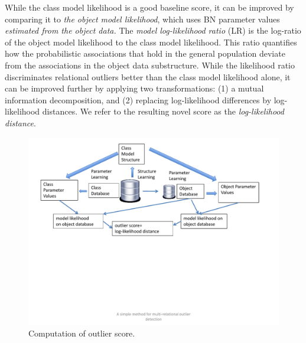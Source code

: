 While the class model likelihood is a good baseline score, it can be improved by comparing it to {\em the object model likelihood}, which uses BN parameter values {\em estimated from the object data.}
The {\em model log-likelihood ratio} (LR) is the log-ratio of the object model likelihood to the class model likelihood. This ratio quantifies how the probabilistic associations that hold in the general population deviate from the associations in the object data substructure.
While the 
likelihood ratio discriminates relational outliers better than the class model likelihood alone, it can be improved further by applying two transformations: (1) a mutual information decomposition, and (2) replacing log-likelihood differences by log-likelihood distances. We refer to the resulting novel score as the {\em log-likelihood distance}.
	\begin{figure}
		\centering
		\includegraphics[width=1\textwidth]{figures/sysFlow.pdf}
		
		\caption{Computation of outlier score. 
			\label{fig:flow}}
	\end{figure}
%
